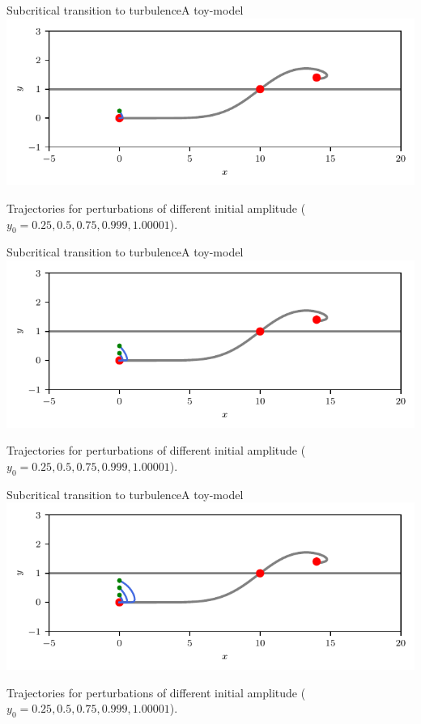 \documentclass[usenames,dvipsnames,svgnames,10pt,aspectratio=169]{beamer}
\begin{document}
\begin{frame}[t, c]{Subcritical transition to turbulence}{A toy-model}
	\centering
	\includegraphics[width=.75\textwidth]{kerswell_phase_plane_ter_0}

	Trajectories for perturbations of different initial amplitude ($y_0 = 0.25, 0.5, 0.75, 0.999, 1.00001$).

	\vspace{1cm}
\end{frame}


\begin{frame}[t, c]{Subcritical transition to turbulence}{A toy-model}
	\centering
	\includegraphics[width=.75\textwidth]{kerswell_phase_plane_ter_1}

	Trajectories for perturbations of different initial amplitude ($y_0 = 0.25, 0.5, 0.75, 0.999, 1.00001$).

	\vspace{1cm}
\end{frame}


\begin{frame}[t, c]{Subcritical transition to turbulence}{A toy-model}
	\centering
	\includegraphics[width=.75\textwidth]{kerswell_phase_plane_ter_2}

	Trajectories for perturbations of different initial amplitude ($y_0 = 0.25, 0.5, 0.75, 0.999, 1.00001$).

	\vspace{1cm}
\end{frame}
\end{document}
